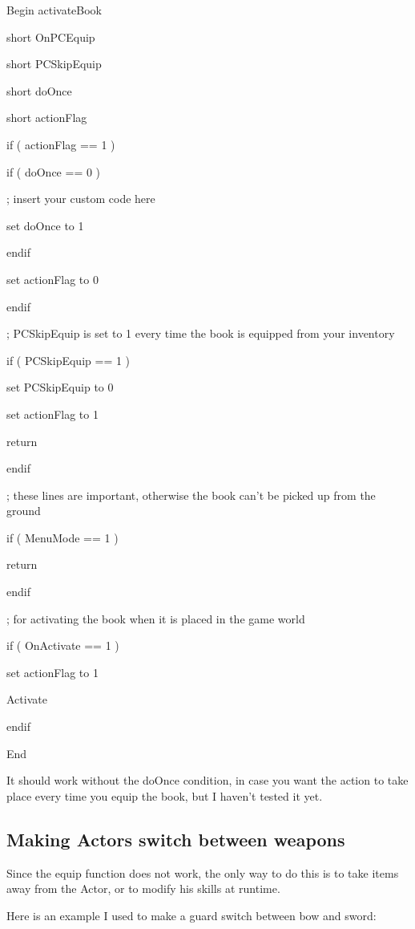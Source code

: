 \documentclass[
]{article}
\begin{document}
Begin activateBook

short OnPCEquip

short PCSkipEquip

short doOnce

short actionFlag

if ( actionFlag == 1 )

if ( doOnce == 0 )

; insert your custom code here

set doOnce to 1

endif

set actionFlag to 0

endif

; PCSkipEquip is set to 1 every time the book is equipped from your
inventory

if ( PCSkipEquip == 1 )

set PCSkipEquip to 0

set actionFlag to 1

return

endif

; these lines are important, otherwise the book can't be picked up from
the ground

if ( MenuMode == 1 )

return

endif

; for activating the book when it is placed in the game world

if ( OnActivate == 1 )

set actionFlag to 1

Activate

endif

End

It should work without the doOnce condition, in case you want the action
to take place every time you equip the book, but I haven't tested it
yet.

\hypertarget{making-actors-switch-between-weapons}{%
\subsection{\texorpdfstring{\hfill\break
Making Actors switch between
weapons}{ Making Actors switch between weapons}}\label{making-actors-switch-between-weapons}}

Since the equip function does not work, the only way to do this is to
take items away from the Actor, or to modify his skills at runtime.

Here is an example I used to make a guard switch between bow and sword:
\end{document}
